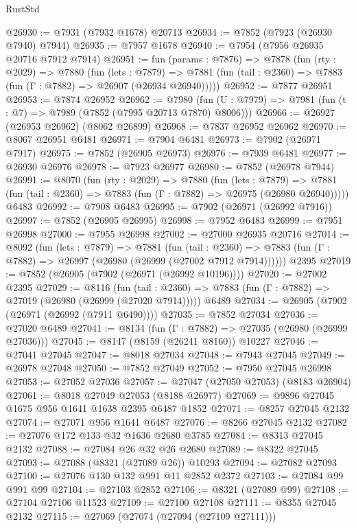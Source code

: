 \begin{lexlean}{RustStd}
\begin{coremodule}
@26930 := @7931 (@7932 @1678) @20713
@26934 := @7852 (@7923 (@26930 @7940) @7944)
@26935 := @7957 @1678
@26940 := @7954 (@7956 @26935 @20716 @7912 @7914)
@26951 := fun (params : @7876) =>
  @7878
    (fun (rty : @2029) =>
    @7880
      (fun (lets : @7879) =>
      @7881 (fun (tail : @2360) => @7883 (fun (Γ : @7882) => @26907 (@26934 @26940)))))
@26952 := @7877 @26951
@26953 := @7874 @26952
@26962 := @7980
    (fun (U : @7979) => @7981 (fun (t : @7) => @7989 (@7852 (@7995 @20713 @7870) @8006)))
@26966 := @26927 (@26953 @26962) (@8062 @26899)
@26968 := @7837 @26952 @26962
@26970 := @8067 @26951 @6481
@26971 := @7904 @6481
@26973 := @7902 (@26971 @7917)
@26975 := @7852 (@26905 @26973)
@26976 := @7939 @6481
@26977 := @26930 @26976
@26978 := @7923 @26977
@26980 := @7852 (@26978 @7944)
@26991 := @8070
    (fun (rty : @2029) =>
    @7880
      (fun (lets : @7879) =>
      @7881 (fun (tail : @2360) => @7883 (fun (Γ : @7882) => @26975 (@26980 @26940)))))
    @6483
@26992 := @7908 @6483
@26995 := @7902 (@26971 (@26992 @7916))
@26997 := @7852 (@26905 @26995)
@26998 := @7952 @6483
@26999 := @7951 @26998
@27000 := @7955 @26998
@27002 := @27000 @26935 @20716
@27014 := @8092
    (fun (lets : @7879) =>
    @7881
      (fun (tail : @2360) =>
      @7883 (fun (Γ : @7882) => @26997 (@26980 (@26999 (@27002 @7912 @7914))))))
    @2395
@27019 := @7852 (@26905 (@7902 (@26971 (@26992 @10196))))
@27020 := @27002 @2395
@27029 := @8116
    (fun (tail : @2360) => @7883 (fun (Γ : @7882) => @27019 (@26980 (@26999 (@27020 @7914)))))
    @6489
@27034 := @26905 (@7902 (@26971 (@26992 (@7911 @6490))))
@27035 := @7852 @27034
@27036 := @27020 @6489
@27041 := @8134 (fun (Γ : @7882) => @27035 (@26980 (@26999 @27036)))
@27045 := @8147 (@8159 (@26241 @8160)) @10227
@27046 := @27041 @27045
@27047 := @8018 @27034
@27048 := @7943 @27045
@27049 := @26978 @27048
@27050 := @7852 @27049
@27052 := @7950 @27045 @26998
@27053 := @27052 @27036
@27057 := @27047 (@27050 @27053) (@8183 @26904)
@27061 := @8018 @27049 @27053 (@8188 @26977)
@27069 := @9896 @27045 @1675 @956 @1641 @1638 @2395 @6487 @1852
@27071 := @8257 @27045 @2132
@27074 := @27071 @956 @1641 @6487
@27076 := @8266 @27045 @2132
@27082 := @27076 @172 @133 @32 @1636 @2680 @3785
@27084 := @8313 @27045 @2132
@27088 := @27084 @26 @32 @26 @2680
@27089 := @8322 @27045
@27093 := @27088 (@8321 (@27089 @26)) @10293
@27094 := @27082 @27093
@27100 := @27076 @130 @132 @991 @11 @2852 @2372
@27103 := @27084 @99 @991 @99
@27104 := @27103 @2852
@27106 := @8321 (@27089 @99)
@27108 := @27104 @27106 @11523
@27109 := @27100 @27108
@27111 := @8355 @27045 @2132
@27115 := @27069 (@27074 (@27094 (@27109 @27111)))

\end{coremodule}
\end{lexlean}
